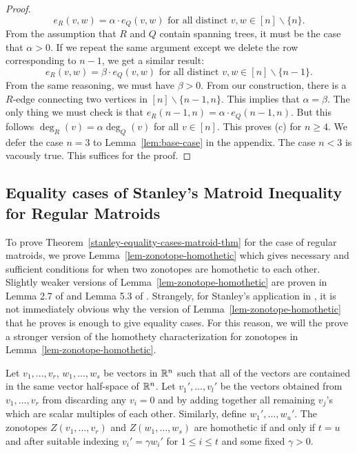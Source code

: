\documentclass{puthesis-UG}
\begin{document}
\begin{proof}
	\[
		e_R(v, w) = \alpha \cdot e_Q(v, w) \text{ for all distinct } v, w \in [n] \backslash \{n\}.
	\]
	From the assumption that $R$ and $Q$ contain spanning trees, it must be the case that $\alpha > 0$. If we repeat the same argument except we delete the row corresponding to $n-1$, we get a similar result:
	\[
		e_R(v, w) = \beta \cdot e_Q(v, w) \text{ for all distinct } v, w \in [n] \backslash \{n-1\}.
	\]
	From the same reasoning, we must have $\beta > 0$. From our construction, there is a $R$-edge connecting two vertices in $[n] \backslash \{n-1, n\}$. This implies that $\alpha = \beta$. The only thing we must check is that $e_R(n-1, n) = \alpha \cdot e_Q(n-1, n)$. But this follows $\deg_R(v) = \alpha \deg_Q(v)$ for all $v \in [n]$. This proves (c) for $n \geq 4$. We defer the case $n = 3$ to Lemma~\ref{lem:base-case} in the appendix. The case $n < 3$ is vacously true. This suffices for the proof.
\end{proof}

\subsection{Equality cases of Stanley's Matroid Inequality for Regular Matroids}


To prove Theorem~\ref{stanley-equality-cases-matroid-thm} for the case of regular matroids, we prove Lemma~\ref{lem-zonotope-homothetic} which gives necessary and sufficient conditions for when two zonotopes are homothetic to each other. Slightly weaker versions of Lemma~\ref{lem-zonotope-homothetic} are proven in Lemma 2.7 of \cite{STANLEY} and Lemma 5.3 of \cite{Kato_2007}. Strangely, for Stanley's application in \cite{STANLEY}, it is not immediately obvious why the version of Lemma~\ref{lem-zonotope-homothetic} that he proves is enough to give equality cases. For this reason, we will the prove a stronger version of the homothety characterization for zonotopes in Lemma~\ref{lem-zonotope-homothetic}. 

\begin{lem} \label{lem-zonotope-homothetic}
	Let $v_1, \ldots, v_r$, $w_1, \ldots, w_s$ be vectors in $\mathbb{R}^n$ such that all of the vectors are contained in the same vector half-space of $\mathbb{R}^n$. Let $v_1', \ldots, v_l'$ be the vectors obtained from $v_1, \ldots, v_r$ from discarding any $v_i = 0$ and by adding together all remaining $v_j$'s which are scalar multiples of each other. Similarly, define $w_1', \ldots, w_u'$. The zonotopes $Z(v_1, \ldots, v_r)$ and $Z(w_1, \ldots, w_s)$ are homothetic if and only if $t = u$ and after suitable indexing $v_i' = \gamma w_i'$ for $1 \leq i \leq t$ and some fixed $\gamma > 0$. 
\end{lem}
\end{document}
